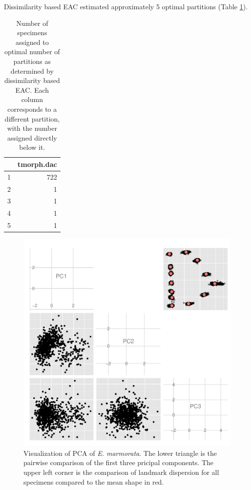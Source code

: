 \documentclass{article}\usepackage{graphicx, color}
\begin{document}
Dissimilarity based EAC estimated approximately 5 optimal partitions (Table \ref{tab:dac}).

\begin{table}[ht]
\begin{center}
\begin{tabular}{rr}
  \hline
 & tmorph.dac \\ 
  \hline
1 & 722 \\ 
  2 &   1 \\ 
  3 &   1 \\ 
  4 &   1 \\ 
  5 &   1 \\ 
   \hline
\end{tabular}
\caption{Number of specimens assigned to optimal number of partitions as determined by dissimilarity based EAC. Each column corresponds to a different partition, with the number assigned directly below it.}
\label{tab:dac}
\end{center}
\end{table}






\begin{figure}[ht]
  \centering
  \includegraphics[width = \textwidth]{figure/gm}
  \caption{Visualization of PCA of \textit{E. marmorata}. The lower triangle is the pairwise comparison of the first three pricipal components. The upper left corner is the comparison of landmark dispersion for all specimens compared to the mean shape in red.}
  \label{fig:gm}
\end{figure}
\end{document}
